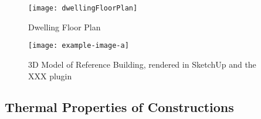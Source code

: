 \begin{figure}[htb]
    \centering
    \texttt{[image: dwellingFloorPlan]}
    \caption{Dwelling Floor Plan}
    \label{fig:floorplan}
\end{figure}

\begin{figure}[htb]
    \centering
    \texttt{[image: example-image-a]}
    \caption[3D Model of Reference Building]{3D Model of Reference Building, rendered in SketchUp and the XXX plugin}
    \label{fig:3dmodel}
\end{figure}


\subsection{Thermal Properties of Constructions}

